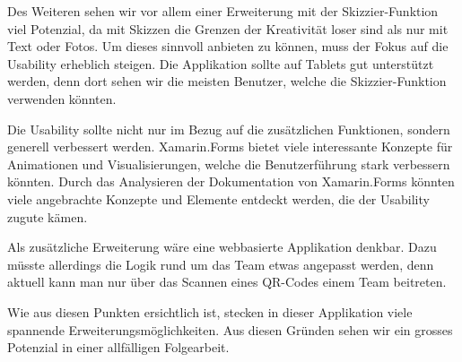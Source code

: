 Des Weiteren sehen wir vor allem einer Erweiterung mit der Skizzier-Funktion viel Potenzial, da mit Skizzen die Grenzen der Kreativität loser sind als nur mit Text oder Fotos. Um dieses sinnvoll anbieten zu können, muss der Fokus auf die Usability erheblich steigen. Die Applikation sollte auf Tablets gut unterstützt werden, denn dort sehen wir die meisten Benutzer, welche die Skizzier-Funktion verwenden könnten. 

Die Usability sollte nicht nur im Bezug auf die zusätzlichen Funktionen, sondern generell verbessert werden. Xamarin.Forms bietet viele interessante Konzepte für Animationen und Visualisierungen, welche die Benutzerführung stark verbessern könnten. Durch das Analysieren der Dokumentation von Xamarin.Forms könnten viele angebrachte Konzepte und Elemente entdeckt werden, die der Usability zugute kämen.

Als zusätzliche Erweiterung wäre eine webbasierte Applikation denkbar. Dazu müsste allerdings die Logik rund um das Team etwas angepasst werden, denn aktuell kann man nur über das Scannen eines QR-Codes einem Team beitreten.

Wie aus diesen Punkten ersichtlich ist, stecken in dieser Applikation viele spannende Erweiterungsmöglichkeiten. Aus diesen Gründen sehen wir ein grosses Potenzial in einer allfälligen Folgearbeit.
